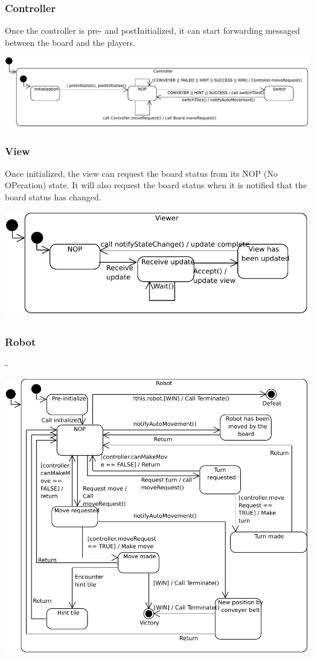 	\subsubsection{Controller}
	Once the controller is pre- and postInitialized, it can start forwarding messaged between the board and the players.

	\includegraphics[width=\linewidth]{statecharts/controller.pdf}

	\subsubsection{View}
	Once initialized, the view can request the board status from its NOP (No OPeration) state. It will also request the board status when it is notified that the board status has changed.
	
	\includegraphics[width=\linewidth]{statecharts/view.pdf}

	\subsubsection{Robot}
	-
	
	\includegraphics[width=\linewidth]{statecharts/robot.pdf}
	

	

